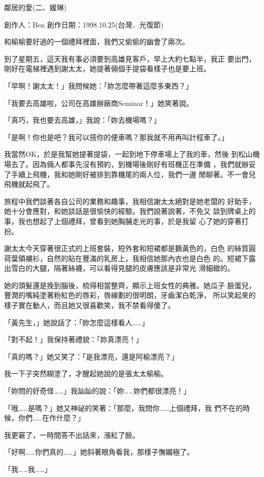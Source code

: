 鄰居的愛(二、媛琳)

創作人：Ben
創作日期：1998.10.25(台灣．光復節)


和榆榆要好過的一個禮拜裡面，我們又偷偷的幽會了兩次。

到了星期五，這天我有事必須要到高雄見客戶，早上大約七點半，我正
要出門，剛好在電梯裡遇到謝太太，她提著倆個手提袋看樣子也是要上班。

「早啊！謝太太！」我問候她：「妳怎麼帶著這麼多東西？」

「我要去高雄啦，公司在高雄辦廠商Seminar！」她笑著說。

「真巧，我也要去高雄，」我說：「妳去機場嗎？」

「是啊！你也是吧？我可以搭你的便車嗎？那我就不用再叫計程車了。」

我當然OK，於是我幫她提著提袋，一起到地下停車場上了我的車，然後
到松山機場去了。因為倆人都事先沒有預約，到機場後剛好有班機正在準備
，我們就辦妥了手續上飛機，我和她剛好被排到靠機尾的兩人位，我們一邊
閒聊著。不一會兒飛機就起飛了。

旅程中我們談著各自公司的業務和趣事，我相信謝太太絕對是她老闆的
好助手，她十分會應對，和她談話是很愉快的經驗。我們說著說著，不免又
談到牌桌上的事，我也想起了上個禮拜，曾看到她胸脯走光的事，於是我留
心了她的穿著打扮。

謝太太今天穿著很正式的上班套裝，短外套和短裙都是鵝黃色的，白色
的絲質圓荷葉領襯衫，自然的貼在豐滿的乳房上，我相信她那內衣也是白色
的。短裙下露出雪白的大腿，隔著絲襪，可以看得見腿的皮膚應該是非常光
滑細緻的。

她的頭髮還是挽到腦後，梳得相當整齊，顯示上班女性的典雅。她瓜子
臉蛋兒，豐潤的嘴純塗著粉紅色的唇彩，唇線劃的很明朗，牙齒潔白乾淨，
所以笑起來的樣子實在動人，而且她又很喜歡笑，我不禁看得傻了。

「黃先生，」她說話了：「妳怎麼這樣看人……」

「對不起！」我保持著禮貌：「妳真漂亮！」

「真的嗎？」她又笑了：「是我漂亮，還是阿榆漂亮？」

我一下子突然糊塗了，才醒起她說的是張太太榆榆。

「妳問的好奇怪……」我訕訕的說：「妳……妳們都很漂亮！」

「哦……是嗎？」她又神祕的笑著：「那麼，我問你……上個禮拜，我
們不在的時候，你們……在作什麼？」

我更窘了，一時間答不出話來，漲紅了臉。

「好啊……你們真的……」她斜著眼角看我，那樣子憮媚極了。

「我……我……」

